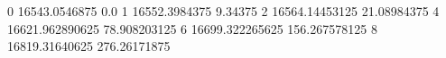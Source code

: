 0 16543.0546875 0.0
1 16552.3984375 9.34375
2 16564.14453125 21.08984375
4 16621.962890625 78.908203125
6 16699.322265625 156.267578125
8 16819.31640625 276.26171875
